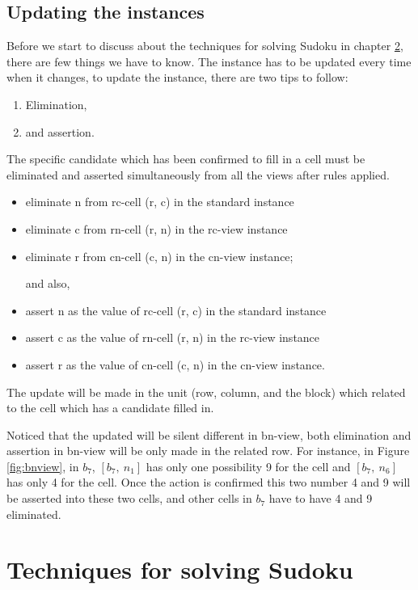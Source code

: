 \documentclass[11pt]{report}
\begin{document}
\section{Updating the instances}
\label{sec:Updatingtheinstances}

Before we start to discuss about the techniques for solving Sudoku in chapter \ref{sec:Techniques}, there are few things we have to know. The instance has to be updated every time when it changes, to update the instance, there are two tips to follow:
\begin{enumerate}
\item Elimination,
\item and assertion.
\end{enumerate}

The specific candidate which has been confirmed to fill in a cell must be eliminated and asserted simultaneously from all the views after rules applied.
\begin{itemize}
\item eliminate n from rc-cell (r, c) in the standard instance
\item eliminate c from rn-cell (r, n) in the rc-view instance
\item eliminate r from cn-cell (c, n) in the cn-view instance;

and also,
\item assert n as the value of rc-cell (r, c) in the standard instance
\item assert c as the value of rn-cell (r, n) in the rc-view instance
\item assert r as the value of cn-cell (c, n) in the cn-view instance.
\end{itemize}

The update will be made in the unit (row, column, and the block) which related to the cell which has a candidate filled in.

Noticed that the updated will be silent different in bn-view, both elimination and assertion in bn-view will be only made in the related row.
For instance, in Figure \ref{fig:bnview}, in $b_{7}$, $[b_{7},\ n_{1}]$ has only one possibility 9 for the cell and $[b_{7},\ n_{6}]$ has only 4 for the cell. Once the action is confirmed this two number 4 and 9 will be asserted into these two cells, and other cells in $b_{7}$ have to have 4 and 9 eliminated. 




\chapter{Techniques for solving Sudoku}
\label{sec:Techniques}
\end{document}
